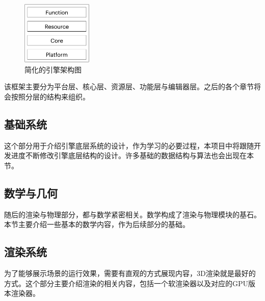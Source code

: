 \begin{figure}[H]
\centering
\includegraphics[center, width=0.30\textwidth]{chapter-front/pic/architecture.png}
\caption{简化的引擎架构图}
\end{figure}

该框架主要分为平台层、核心层、资源层、功能层与编辑器层。之后的各个章节将会按照分层的结构来组织。

\maketitle
\subsection{基础系统}

这个部分用于介绍引擎底层系统的设计，作为学习的必要过程，本项目中将跟随开发进度不断修改引擎底层结构的设计。许多基础的数据结构与算法也会出现在本节。

\maketitle
\subsection{数学与几何}

随后的渲染与物理部分，都与数学紧密相关。数学构成了渲染与物理模块的基石。本节主要介绍一些基本的数学内容，作为后续部分的基础。

\maketitle
\subsection{渲染系统}

为了能够展示场景的运行效果，需要有直观的方式展现内容，3D渲染就是最好的方式。这个部分主要介绍渲染的相关内容，包括一个软渲染器以及对应的GPU版本渲染器。

\maketitle
